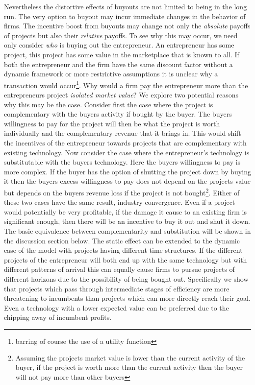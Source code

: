 Nevertheless the distortive effects of buyouts are not limited to being in the long run. The very option to buyout may incur immediate changes in the behavior of firms. The incentive boost from buyouts may change not only the \textit{absolute} payoffs of projects but also their \textit{relative} payoffs. To see why this may occur, we need only consider \textit{who} is buying out the entrepreneur. An entrepreneur has some project, this project has some value in the marketplace that is known to all. If both the entrepreneur and the firm have the same discount factor without a dynamic framework or more restrictive assumptions it is unclear why a transaction would occur\footnote{barring of course the use of a utility function}. Why would a firm pay the entrepreneur more than the entrepreneurs project \textit{isolated market value}?  We explore two potential reasons why this may be the case.
Consider first the case where the project is complementary with the buyers activity if bought by the buyer. The buyers willingness to pay for the project will then be what the project is worth individually and the complementary revenue that it brings in. This would shift the incentives of the entrepreneur towards projects that are complementary with existing technology. 
Now consider the case where the entrepreneur's technology is substitutable with the buyers technology. Here the buyers willingness to pay is more complex. If the buyer has the option of shutting the project down by buying it then the buyers excess willingness to pay does not depend on the projects value but depends on the buyers revenue loss if the project is not bought\footnote{Assuming the projects market value is lower than the current activity of the buyer, if the project is worth more than the current activity then the buyer will not pay more than other buyers}.
Either of these two cases have the same result, industry convergence. Even if a project would potentially be very profitable, if the damage it cause to an existing firm is significant enough, then there will be an incentive to buy it out and shut it down. The basic equivalence between complementarity and substitution will be shown in the discussion section below. 
The static effect can be extended to the dynamic case of the model with projects having different time structures. If the different projects of the entrepreneur will both end up with the same technology but with different patterns of arrival this can equally cause firms to pursue projects of different horizons due to the possibility of being bought out. Specifically we show that projects which pass through intermediate stages of efficiency are more threatening to incumbents than projects which can more directly reach their goal. Even a technology with a lower expected value can be preferred due to the chipping away of incumbent profits. 
